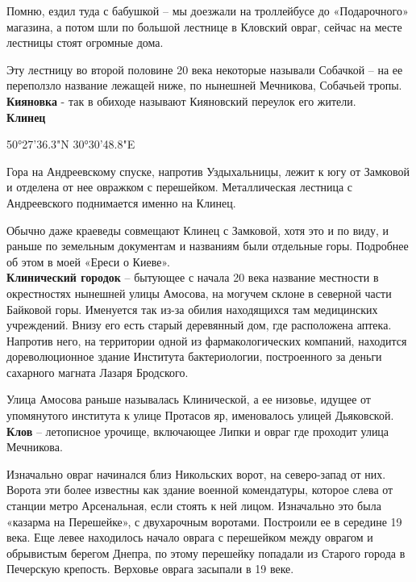 Помню, ездил туда с бабушкой – мы доезжали на троллейбусе до «Подарочного» магазина, а потом шли по большой лестнице в Кловский овраг, сейчас на месте лестницы стоят огромные дома.

Эту лестницу во второй половине 20 века некоторые называли Собачкой – на ее переползло название лежащей ниже, по нынешней Мечникова, Собачьей тропы.\\

\textbf{Кияновка} - так в обиходе называют Кияновский переулок его жители.\\

\textbf{Клинец}

50°27'36.3"N 30°30'48.8"E

Гора на Андреевскому спуске, напротив Уздыхальницы, лежит к югу от Замковой и отделена от нее овражком с перешейком. Металлическая лестница с Андреевского поднимается именно на Клинец. 

Обычно даже краеведы совмещают Клинец с Замковой, хотя это и по виду, и раньше по земельным документам и названиям были отдельные горы. Подробнее об этом в моей «Ереси о Киеве».\\

\textbf{Клинический городок} – бытующее с начала 20 века название местности в окрестностях нынешней улицы Амосова, на могучем склоне в северной части Байковой горы. Именуется так из-за обилия находящихся там медицинских учреждений. Внизу его есть старый деревянный дом, где расположена аптека. Напротив него, на территории одной из фармакологических компаний, находится дореволюционное здание Института бактериологии, построенного за деньги сахарного магната Лазаря Бродского.

Улица Амосова раньше называлась Клинической, а ее низовье, идущее от упомянутого института к улице Протасов яр, именовалось улицей Дьяковской.\\

\textbf{Клов} – летописное урочище, включающее Липки и овраг где проходит улица Мечникова. 

Изначально овраг начинался близ Никольских ворот, на северо-запад от них. Ворота эти более известны как здание военной комендатуры, которое слева от станции метро Арсенальная, если стоять к ней лицом. Изначально это была «казарма на Перешейке», с двухарочным воротами. Построили ее в середине 19 века. Еще левее находилось начало оврага с перешейком между оврагом и обрывистым берегом Днепра, по этому перешейку попадали из Старого города в Печерскую крепость. Верховье оврага засыпали в 19 веке.

